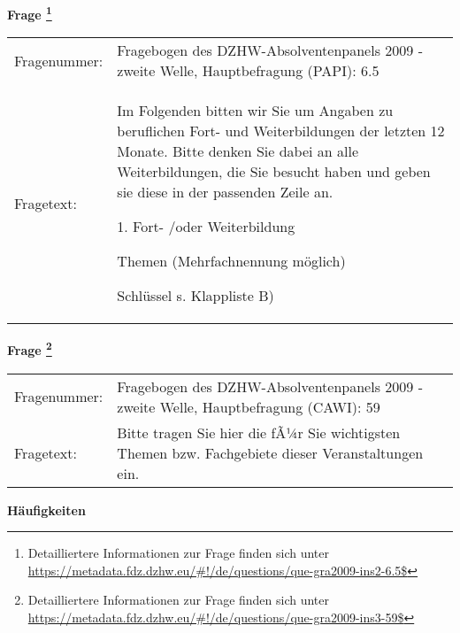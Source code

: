 				\vspace*{0.5cm}
                \noindent\textbf{Frage
	                \footnote{Detailliertere Informationen zur Frage finden sich unter
		              \url{https://metadata.fdz.dzhw.eu/\#!/de/questions/que-gra2009-ins2-6.5$}}}\\
				\begin{tabularx}{\hsize}{@{}lX}
					Fragenummer: &
					  Fragebogen des DZHW-Absolventenpanels 2009 - zweite Welle, Hauptbefragung (PAPI):
					  6.5
 \\
					Fragetext: & Im Folgenden bitten wir Sie um Angaben zu beruflichen Fort- und Weiterbildungen der letzten 12 Monate. Bitte denken Sie dabei an alle Weiterbildungen, die Sie besucht haben und geben sie diese in der passenden Zeile an.\par  1. Fort- /oder Weiterbildung\par  Themen (Mehrfachnennung möglich)\par  Schlüssel s. Klappliste B) \\
				\end{tabularx}
				\vspace*{0.5cm}
                \noindent\textbf{Frage
	                \footnote{Detailliertere Informationen zur Frage finden sich unter
		              \url{https://metadata.fdz.dzhw.eu/\#!/de/questions/que-gra2009-ins3-59$}}}\\
				\begin{tabularx}{\hsize}{@{}lX}
					Fragenummer: &
					  Fragebogen des DZHW-Absolventenpanels 2009 - zweite Welle, Hauptbefragung (CAWI):
					  59
 \\
					Fragetext: & Bitte tragen Sie hier die fÃ¼r Sie wichtigsten Themen bzw. Fachgebiete dieser Veranstaltungen ein. \\
				\end{tabularx}





        		\vspace*{0.5cm}
                \noindent\textbf{Häufigkeiten}

